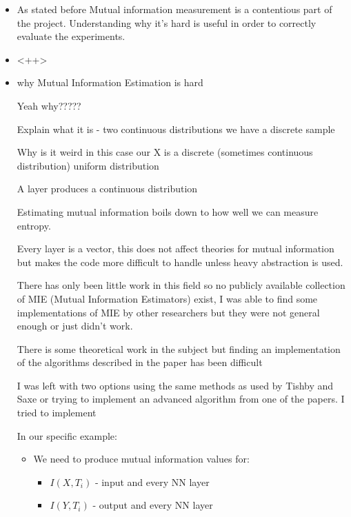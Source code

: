 \begin{itemize}
  \item{
      As stated before Mutual information measurement is a contentious part of
      the project. Understanding why it's hard is useful in order to correctly
      evaluate the experiments.
    }
  \item{
      <++>
    }
\end{itemize}

\begin{itemize}
  \item{
      why Mutual Information Estimation is hard

      Yeah why?????

      Explain what it is - two continuous distributions we have a discrete
      sample 

      Why is it weird in this case
      our X is a discrete (sometimes continuous distribution) uniform
      distribution 

      A layer produces a continuous distribution

      Estimating mutual information boils down to how well we can measure
      entropy.

      Every layer is a vector, this does not affect theories for mutual
      information but makes the code more difficult to handle unless heavy
      abstraction is used.

      There has only been little work in this field so no publicly available
      collection of MIE (Mutual Information Estimators) exist, I was able to
      find some implementations of MIE by other researchers but they were not
      general enough or just didn't work. 

      There is some theoretical work in the subject but finding an
      implementation of the algorithms described in the paper has been difficult

      I was left with two options using the same methods as used by Tishby and
      Saxe or trying to implement an advanced algorithm from one of the papers.
      I tried to implement 

      In our specific example:
      \begin{itemize}
        \item{
            We need to produce mutual information values for:
            \begin{itemize}
              \item{
                  $I(X, T_i)$ - input and every NN layer
                }
              \item{
                  $I(Y, T_i)$ - output and every NN layer
                }
            \end{itemize}

}
\end{itemize}}
\end{itemize}
